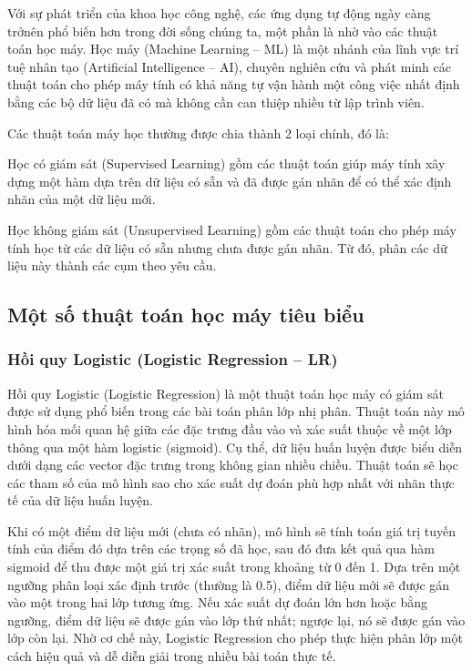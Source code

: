 \documentclass[12pt, a4paper]{report}
\begin{document}
Với sự phát triển của khoa học công nghệ, các ứng dụng tự động ngày càng trởnên phổ biến hơn trong đời sống chúng ta, một phần là nhờ vào các thuật toán học máy. Học máy (Machine Learning – ML) là một nhánh của lĩnh vực trí tuệ nhân tạo (Artificial Intelligence – AI), chuyên nghiên cứu và phát minh các thuật toán cho phép máy tính có khả năng tự vận hành một công việc nhất định bằng các bộ dữ liệu đã có
mà không cần can thiệp nhiều từ lập trình viên.

Các thuật toán máy học thường được chia thành 2 loại chính, đó là:

Học có giám sát (Supervised Learning) gồm các thuật toán giúp máy tính xây dựng một hàm dựa trên dữ liệu có sẵn và đã được gán nhãn để có thể xác định nhãn của một dữ liệu mới.

Học không giám sát (Unsupervised Learning) gồm các thuật toán cho phép máy tính học từ các dữ liệu có sẵn nhưng chưa được gán nhãn. Từ đó, phân các dữ liệu này thành các cụm theo yêu cầu.

\subsection{Một số thuật toán học máy tiêu biểu}
\subsubsection{Hồi quy Logistic (Logistic Regression -- LR)}
Hồi quy Logistic (Logistic Regression) là một thuật toán học máy có giám sát được sử dụng phổ biến trong các bài toán phân lớp nhị phân. Thuật toán này mô hình hóa mối quan hệ giữa các đặc trưng đầu vào và xác suất thuộc về một lớp thông qua một hàm logistic (sigmoid). Cụ thể, dữ liệu huấn luyện được biểu diễn dưới dạng các vector đặc trưng trong không gian nhiều chiều. Thuật toán sẽ học các tham số của mô hình sao cho xác suất dự đoán phù hợp nhất với nhãn thực tế của dữ liệu huấn luyện.

Khi có một điểm dữ liệu mới (chưa có nhãn), mô hình sẽ tính toán giá trị tuyến tính của điểm đó dựa trên các trọng số đã học, sau đó đưa kết quả qua hàm sigmoid để thu được một giá trị xác suất trong khoảng từ 0 đến 1. Dựa trên một ngưỡng phân loại xác định trước (thường là 0.5), điểm dữ liệu mới sẽ được gán vào một trong hai lớp tương ứng. Nếu xác suất dự đoán lớn hơn hoặc bằng ngưỡng, điểm dữ liệu sẽ được gán vào lớp thứ nhất; ngược lại, nó sẽ được gán vào lớp còn lại. Nhờ cơ chế này, Logistic Regression cho phép thực hiện phân lớp một cách hiệu quả và dễ diễn giải trong nhiều bài toán thực tế.
\end{document}
